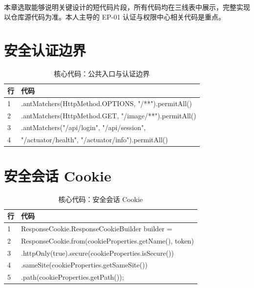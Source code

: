 \documentclass[UTF8,a4paper,12pt,openany,fontset=windows]{ctexrep}
\newcommand{\codefont}{\ttfamily\footnotesize}
\begin{document}
本章选取能够说明关键设计的短代码片段，所有代码均在三线表中展示，完整实现以仓库源代码为准。本人主导的 EP-01 认证与权限中心相关代码是重点。

\section{安全认证边界}
\begin{table}[H]
  \centering
  \caption{核心代码：公共入口与认证边界}
  \begin{tabularx}{\textwidth}{p{1.2cm}L}
    \toprule
    行 & 代码 \\
     & \codefont .antMatchers(HttpMethod.OPTIONS, "/**").permitAll() \\
    2 & \codefont .antMatchers(HttpMethod.GET, "/image/**").permitAll() \\
    3 & \codefont .antMatchers("/api/login", "/api/session", \\
    4 & \codefont \quad "/actuator/health", "/actuator/info").permitAll() \\
    \bottomrule
  \end{tabularx}
\end{table}

\section{安全会话 Cookie}
\begin{table}[H]
  \centering
  \caption{核心代码：安全会话 Cookie}
  \begin{tabularx}{\textwidth}{p{1.2cm}L}
    \toprule
    行 & 代码 \\
     & \codefont ResponseCookie.ResponseCookieBuilder builder = \\
    2 & \codefont \quad ResponseCookie.from(cookieProperties.getName(), token) \\
    3 & \codefont \quad .httpOnly(true).secure(cookieProperties.isSecure()) \\
    4 & \codefont \quad .sameSite(cookieProperties.getSameSite()) \\
    5 & \codefont \quad .path(cookieProperties.getPath()); \\
    \bottomrule
  \end{tabularx}
\end{table}
\end{document}
